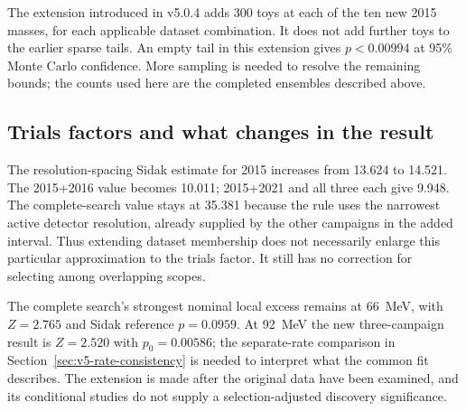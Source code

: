 The extension introduced in v5.0.4 adds 300 toys at each of the ten new 2015
masses, for each applicable dataset combination. It does not add further
toys to the earlier sparse tails. An empty tail in this extension gives
$p<0.00994$ at 95\% Monte Carlo confidence. More sampling is needed to
resolve the remaining bounds; the counts used here are the completed
ensembles described above.

\subsection{Trials factors and what changes in the result}
The resolution-spacing Sidak estimate for 2015 increases from 13.624 to
14.521. The 2015+2016 value becomes 10.011; 2015+2021 and all three each
give 9.948. The complete-search value stays at 35.381 because the rule
uses the narrowest active detector resolution, already supplied by the
other campaigns in the added interval. Thus extending dataset membership
does not necessarily enlarge this particular approximation to the trials
factor. It still has no correction for selecting among overlapping scopes.

The complete search's strongest nominal local excess remains at 66~MeV,
with $Z=2.765$ and Sidak reference $p=0.0959$. At 92~MeV the new
three-campaign result is $Z=2.520$ with $p_0=0.00586$; the separate-rate
comparison in Section~\ref{sec:v5-rate-consistency} is needed to interpret
what the common fit describes. The extension is made after the original
data have been examined, and its conditional studies do not supply a
selection-adjusted discovery significance.
